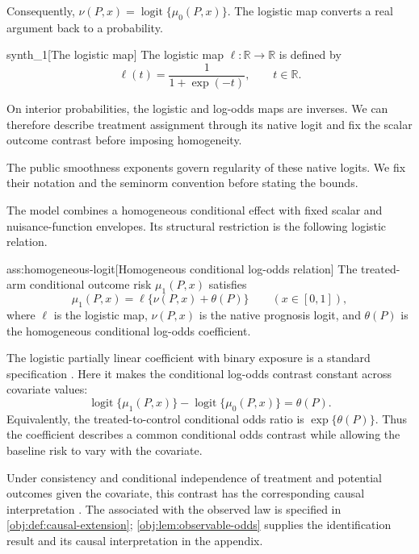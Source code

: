 \documentclass[11pt]{article}
\begin{document}
Consequently, \(\nu(P,x)=\operatorname{logit}\{\mu_0(P,x)\}\). The logistic map  converts a real argument  back to a probability.

\begin{definitionv}{synth_1}[The logistic map]
The logistic map \(\ell:\mathbb R\to\mathbb R\) is defined by
\[
\ell(t)=\frac{1}{1+\exp(-t)},\qquad t\in\mathbb R.
\]
\end{definitionv}

On interior probabilities, the logistic and log-odds maps are inverses. We can therefore describe treatment assignment through its native logit and fix the scalar outcome contrast before imposing homogeneity.



The public smoothness exponents govern regularity of these native logits. We fix their notation and the seminorm convention before stating the bounds.



The model combines a homogeneous conditional effect with fixed scalar and nuisance-function envelopes. Its structural restriction is the following logistic relation.

\begin{assumptionv}{ass:homogeneous-logit}[Homogeneous conditional log-odds relation]
The treated-arm conditional outcome risk \(\mu_1(P,x)\) satisfies
\[
\mu_1(P,x)=\ell\{\nu(P,x)+\theta(P)\}
\qquad (x\in[0,1]),
\]
where \(\ell\) is the logistic map, \(\nu(P,x)\) is the native prognosis logit, and \(\theta(P)\) is the homogeneous conditional log-odds coefficient.
\end{assumptionv}

The logistic partially linear coefficient with binary exposure is a standard specification \citep{Tan2019LogisticDR}. Here it makes the conditional log-odds contrast constant across covariate values:
\[
\operatorname{logit}\{\mu_1(P,x)\}
-
\operatorname{logit}\{\mu_0(P,x)\}
=\theta(P).
\]
Equivalently, the treated-to-control conditional odds ratio is \(\exp\{\theta(P)\}\). Thus the coefficient describes a common conditional odds contrast while allowing the baseline risk to vary with the covariate.

Under consistency and conditional independence of treatment and potential outcomes given the covariate, this contrast has the corresponding causal interpretation \citep{Rubin1974,Rosenbaum1983}. The  associated with the observed law is specified in \cref{obj:def:causal-extension}; \cref{obj:lem:observable-odds} supplies the identification result and its causal interpretation in the appendix.
\end{document}

